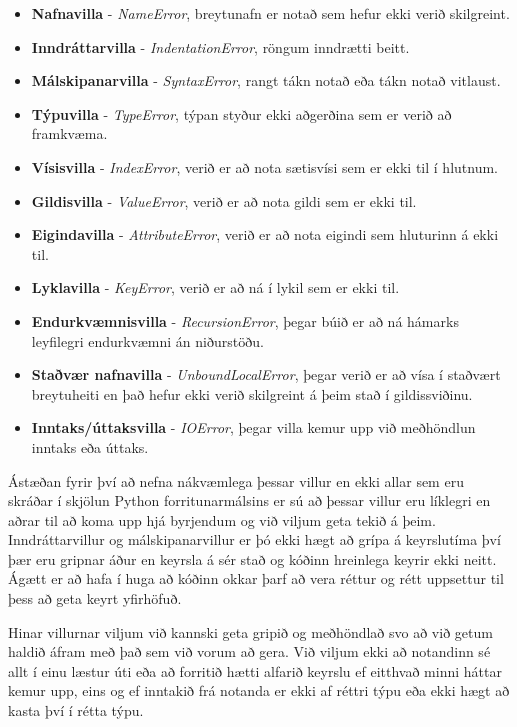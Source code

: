 \begin{itemize}
	\item \textbf{Nafnavilla} - \emph{NameError}, breytunafn er notað sem hefur ekki verið skilgreint.
	\item \textbf{Inndráttarvilla }- \emph{IndentationError}, röngum inndrætti beitt.
	\item \textbf{Málskipanarvilla} - \emph{SyntaxError}, rangt tákn notað eða tákn notað vitlaust.
	\item \textbf{Týpuvilla} - \emph{TypeError}, týpan styður ekki aðgerðina sem er verið að framkvæma.
	\item \textbf{Vísisvilla} - \emph{IndexError}, verið er að nota sætisvísi sem er ekki til í hlutnum.
	\item \textbf{Gildisvilla} - \emph{ValueError}, verið er að nota gildi sem er ekki til.
	\item \textbf{Eigindavilla} - \emph{AttributeError}, verið er að nota eigindi sem hluturinn á ekki til.
	\item \textbf{Lyklavilla} - \emph{KeyError}, verið er að ná í lykil sem er ekki til.
	\item \textbf{Endurkvæmnisvilla} - \emph{RecursionError}, þegar búið er að ná hámarks leyfilegri endurkvæmni án niðurstöðu.
	\item \textbf{Staðvær nafnavilla} - \emph{UnboundLocalError}, þegar verið er að vísa í staðvært breytuheiti en það hefur ekki verið skilgreint á þeim stað í gildissviðinu.
	\item \textbf{Inntaks/úttaksvilla} - \emph{IOError}, þegar villa kemur upp við meðhöndlun inntaks eða úttaks.
\end{itemize}
\vspace{0.5cm}
Ástæðan fyrir því að nefna nákvæmlega þessar villur en ekki allar sem eru skráðar í skjölun Python forritunarmálsins er sú að þessar villur eru líklegri en aðrar til að koma upp hjá byrjendum og við viljum geta tekið á þeim.
Inndráttarvillur og málskipanarvillur er þó ekki hægt að grípa á keyrslutíma því þær eru gripnar áður en keyrsla á sér stað og kóðinn hreinlega keyrir ekki neitt.
Ágætt er að hafa í huga að kóðinn okkar þarf að vera réttur og rétt uppsettur til þess að geta keyrt yfirhöfuð.

Hinar villurnar viljum við kannski geta gripið og meðhöndlað svo að við getum haldið áfram með það sem við vorum að gera.
Við viljum ekki að notandinn sé allt í einu læstur úti eða að forritið hætti alfarið keyrslu ef eitthvað minni háttar kemur upp, eins og ef inntakið frá notanda er ekki af réttri týpu eða ekki hægt að kasta því í rétta týpu.

